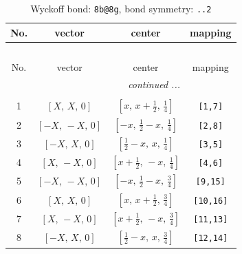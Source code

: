 \documentclass[fleqn,8pt]{jsarticle}
\begin{document}
\begin{longtable}{cccc}
\caption{Wyckoff bond: {\tt 8b@8g}, bond symmetry: {\tt ..2}}
 \\
 \hline \hline
No. & vector & center & mapping \\ \hline \endfirsthead

\multicolumn{3}{l}{\tablename\ \thetable{}} \\
 \hline \hline
No. & vector & center & mapping \\ \hline \endhead

 \hline \hline
\multicolumn{3}{r}{\footnotesize\it continued ...} \\ \endfoot

 \hline \hline
\multicolumn{3}{r}{} \\ \endlastfoot

1 & $\left[ X,\, X,\, 0 \right]$ & $\left[ x,\, x + \frac{1}{2},\, \frac{1}{4} \right]$ & {\tt [1,7]} \\ \hline
2 & $\left[ - X,\, - X,\, 0 \right]$ & $\left[ - x,\, \frac{1}{2} - x,\, \frac{1}{4} \right]$ & {\tt [2,8]} \\ \hline
3 & $\left[ - X,\, X,\, 0 \right]$ & $\left[ \frac{1}{2} - x,\, x,\, \frac{1}{4} \right]$ & {\tt [3,5]} \\ \hline
4 & $\left[ X,\, - X,\, 0 \right]$ & $\left[ x + \frac{1}{2},\, - x,\, \frac{1}{4} \right]$ & {\tt [4,6]} \\ \hline
5 & $\left[ - X,\, - X,\, 0 \right]$ & $\left[ - x,\, \frac{1}{2} - x,\, \frac{3}{4} \right]$ & {\tt [9,15]} \\ \hline
6 & $\left[ X,\, X,\, 0 \right]$ & $\left[ x,\, x + \frac{1}{2},\, \frac{3}{4} \right]$ & {\tt [10,16]} \\ \hline
7 & $\left[ X,\, - X,\, 0 \right]$ & $\left[ x + \frac{1}{2},\, - x,\, \frac{3}{4} \right]$ & {\tt [11,13]} \\ \hline
8 & $\left[ - X,\, X,\, 0 \right]$ & $\left[ \frac{1}{2} - x,\, x,\, \frac{3}{4} \right]$ & {\tt [12,14]} \\
\end{longtable}
\renewcommand{\arraystretch}{1.2}
\end{document}
